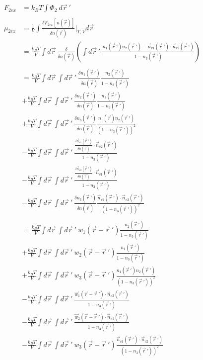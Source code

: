 \documentclass[double,12pt]{revtex4-2}
\begin{document}
\begin{align}
    F_{2ex} &= k_BT\int \Phi_2 ~d\vec r~' \\ \nonumber\\
    \mu_{2ex} &= \frac{1}{V}\int \frac{\delta F_{2ex}[n(\vec r)]}{\delta 
          n(\vec r)}\bigg|_{T,V} d\vec{r} \\
%
          &= \frac{k_BT}{V} \int d\vec r ~\frac{\delta }{\delta n(\vec r)}
          \left(\int d \vec r~' ~\frac{n_1(\vec r~')n_2(\vec r~')-\vec n_{v1}
          (\vec r~')\cdot \vec n_{v2}(\vec r~')}{1-n_3(\vec r~')}\right) 
          \nonumber\\ \\        
%
          &= \frac{k_BT}{V} \int d\vec r~ \int d \vec r~' ~
          \frac{\delta n_1(\vec r~')}{\delta n(\vec r)}
          \frac{n_2(\vec r~')}{1-n_3(\vec r~')}   \nonumber\\
          &+\frac{k_BT}{V} \int d\vec r~ \int d \vec r~' ~
          \frac{\delta n_2(\vec r~')}{\delta n(\vec r)}
          \frac{n_1(\vec r~')}{1-n_3(\vec r~')}   \nonumber\\
          &+\frac{k_BT}{V} \int d\vec r~ \int d \vec r~'~
          \frac{\delta n_3(\vec r~')}{\delta n(\vec r)}
          \frac{n_1(\vec r)n_2(\vec r~')}{(1-n_3(\vec r~'))^2}  \nonumber\\
          &-\frac{k_BT}{V} \int d\vec r~ \int d \vec r~'~ \frac{\frac{\delta 
          \vec n_{v1}(\vec r~')}{\delta n(\vec r)}\cdot \vec n_{v2}(\vec r~')}
          {1-n_3(\vec r~')}  \nonumber\\
          &-\frac{k_BT}{V} \int d\vec r~ \int d \vec r~'~ \frac{\frac{\delta 
          \vec n_{v2}(\vec r~')}{\delta n(\vec r)}\cdot \vec n_{v1}(\vec r~')}
          {1-n_3(\vec r~')}  \nonumber\\
          &-\frac{k_BT}{V} \int d\vec r~\int d \vec r~'~
          \frac{\delta n_3(\vec r~')}{\delta n(\vec r)}
           \frac{\vec n_{v1}(\vec r~')\cdot \vec n_{v2}(\vec r~')}
           {(1-n_3(\vec r~'))^2} \\ \nonumber\\
%
          &= \frac{k_BT}{V} \int d\vec r~ \int d \vec r~' ~w_1(\vec r-\vec r~')
          \frac{n_2(\vec r~')}{1-n_3(\vec r~')}   \nonumber\\
          &+\frac{k_BT}{V} \int d\vec r~ \int d \vec r~' ~w_2(\vec r-\vec r~')
          \frac{n_1(\vec r~')}{1-n_3(\vec r~')}   \nonumber\\
          &+\frac{k_BT}{V} \int d\vec r~ \int d \vec r~'~w_3(\vec r - \vec r~') 
          \frac{n_1(\vec r~')n_2(\vec r~')}{(1-n_3(\vec r~'))^2}  \nonumber\\
          &-\frac{k_BT}{V} \int d\vec r~ \int d \vec r~' ~\frac{\vec w_1(\vec r 
          - \vec r~')\cdot \vec n_{v2}(\vec r~')}{1-n_3(\vec r~')}  \nonumber\\
          &-\frac{k_BT}{V} \int d\vec r~ \int d \vec r~'~ \frac{\vec w_2(\vec r 
          - \vec r~')\cdot \vec n_{v1}(\vec r~')}{1-n_3(\vec r~')}  \nonumber\\
          &-\frac{k_BT}{V} \int d\vec r~\int d \vec r~'~ w_3(\vec r - \vec r~')
           \frac{\vec n_{v1}(\vec r~')\cdot \vec n_{v2}(\vec r~')}
           {(1-n_3(\vec r~'))^2} 
\end{align}
\end{document}
